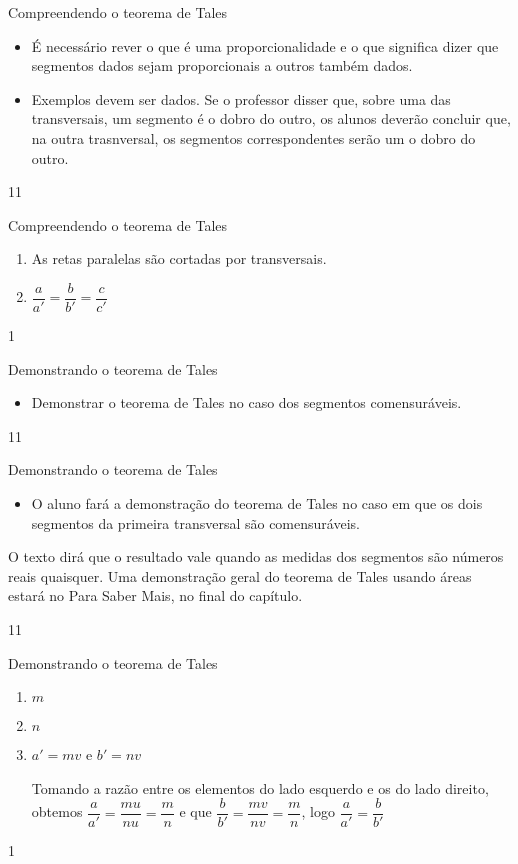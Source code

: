 \begin{sugestions}{Compreendendo o teorema de Tales}
{
\begin{itemize}
\item {} 
É necessário rever o que é uma proporcionalidade e o que significa dizer que  segmentos dados sejam proporcionais a outros também dados.

\item {} 
Exemplos devem ser dados. Se o professor disser que, sobre uma das transversais, um segmento é o dobro do outro, os alunos deverão concluir que, na outra trasnversal, os segmentos correspondentes serão um o dobro do outro.

\end{itemize}
}{1}{1}
\end{sugestions}
\begin{answer}{Compreendendo o teorema de Tales}
{
\begin{enumerate}
\item {} 
As retas paralelas são cortadas por transversais.

\item {} 
\(\dfrac{a}{a'}=\dfrac{b}{b'}=\dfrac{c}{c'}\)

\end{enumerate}
}{1}
\end{answer}
\begin{objectives}{Demonstrando o teorema de Tales}
{
\begin{itemize}
\item {} 
Demonstrar o teorema de Tales no caso dos segmentos comensuráveis.

\end{itemize}
}{1}{1}
\end{objectives}
\begin{sugestions}{Demonstrando o teorema de Tales}
{
\begin{itemize}
\item {} 
O aluno fará a demonstração do teorema de Tales no caso em que os dois segmentos da primeira transversal são comensuráveis.

\end{itemize}

O texto dirá que o resultado vale quando as medidas dos segmentos são números reais quaisquer. Uma demonstração geral do teorema de Tales usando áreas estará no Para Saber Mais, no final do capítulo.
}{1}{1}
\end{sugestions}
\clearmargin
\begin{answer}{Demonstrando o teorema de Tales}
{
\begin{enumerate}
\item {} 
\(m\)

\item {} 
\(n\)

\item {} 
\(a'= mv\) e \(b'=nv\)

Tomando a razão entre os elementos do lado esquerdo e os do lado direito, obtemos \(\dfrac{a}{a'}=\dfrac{mu}{nu}=\dfrac{m}{n}\) e que \(\dfrac{b}{b'}=\dfrac{mv}{nv}=\dfrac{m}{n}\), logo \(\dfrac{a}{a'}=\dfrac{b}{b'}\)

\end{enumerate}
}{1}
\end{answer}

